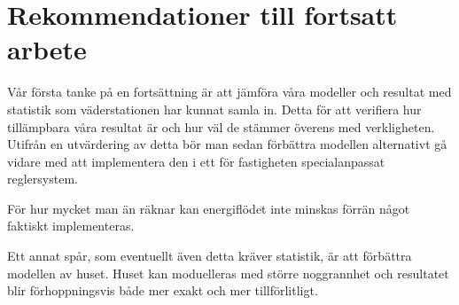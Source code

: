 \section{Rekommendationer till fortsatt arbete}

Vår första tanke på en fortsättning är att jämföra våra modeller och resultat med statistik som väderstationen har kunnat samla in. Detta för att verifiera hur tillämpbara våra resultat är och hur väl de stämmer överens med verkligheten. Utifrån en utvärdering av detta bör man sedan förbättra modellen alternativt gå vidare med att implementera den i ett för fastigheten specialanpassat reglersystem.

För hur mycket man än räknar kan energiflödet inte minskas förrän något faktiskt implementeras.

Ett annat spår, som eventuellt även detta kräver statistik, är att förbättra modellen av huset. Huset kan moduelleras med större noggrannhet och resultatet blir förhoppningsvis både mer exakt och mer tillförlitligt.
